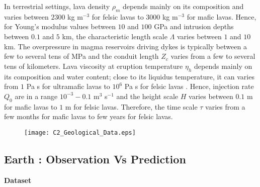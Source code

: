 In terrestrial settings,  lava density $\rho_m$ depends  mainly on its
composition and varies between $ 2300$ kg m$^{-3}$ for felsic lavas to
$3000$ kg m$^{-3}$ for mafic  lavas. Hence, for Young's modulus values
between $10$ and $100$ GPa and  intrusion depths between $0.1$ and $5$
km, the characteristic  length scale $\Lambda$ varies  between $1$ and
$10$  km.   The overpressure  in  magma  reservoirs driving  dykes  is
typically    between    a    few    to    several    tens    of    MPa
\citep{Tait:1988vn,Marti:2000fe} and  the conduit length  $Z_c$ varies
from a few  to several tens of kilometers. Lava  viscosity at eruption
temperature  $\eta_h$  depends mainly  on  its  composition and  water
content; close to its liquidus temperature,  it can varies from $1$ Pa
s  for   ultramafic  lavas   to  $10^{6}$  Pa   s  for   felsic  lavas
\citep{Anonymous:CZVBrBvv,Giordano:2008em,Whittington:2009fv,Chevrel:2013jn}.
Hence,  injection  rate  $Q_0$  are in  a  range  $10^{-3}-0.1$  m$^3$
s$^{-1}$ and  the height scale  $H$ varies  between $0.1$ m  for mafic
lavas to  $1$ m for  felsic lavas.   Therefore, the time  scale $\tau$
varies  from a  few months  for mafic  lavas to  few years  for felsic
lavas.

\begin{figure}
  \begin{center}
    \graphicspath{ {/Users/teihorey/Documents/These/Manuscript/Figure/Chapter2/} }
    \texttt{[image: C2\_Geological\_Data.eps]}
    \caption{}
    \label{C2_Geological_Data}
  \end{center}
\end{figure}

\subsection{Earth : Observation Vs Prediction}
\label{sec:observ-vs-pred}

\vspace{.5cm} \textbf{Dataset} \vspace{.5cm}

